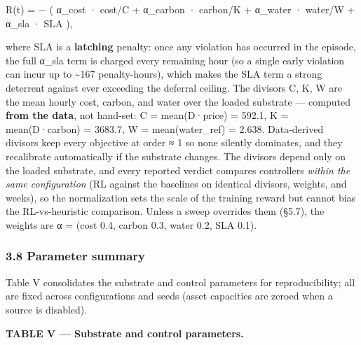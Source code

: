 \documentclass[
  11pt,
]{article}
\newcounter{none} %
\begin{document}
R(t) = − ( α\_cost · cost/C + α\_carbon · carbon/K + α\_water · water/W
+ α\_sla · SLA ),

where SLA is a \textbf{latching} penalty: once any violation has
occurred in the episode, the full α\_sla term is charged every remaining
hour (so a single early violation can incur up to \textasciitilde167
penalty-hours), which makes the SLA term a strong deterrent against ever
exceeding the deferral ceiling. The divisors C, K, W are the mean hourly
cost, carbon, and water over the loaded substrate --- computed
\textbf{from the data}, not hand-set: C = mean(D·price) = 592.1, K =
mean(D·carbon) = 3683.7, W = mean(water\_ref) = 2.638. Data-derived
divisors keep every objective at order ≈ 1 so none silently dominates,
and they recalibrate automatically if the substrate changes. The
divisors depend only on the loaded substrate, and every reported verdict
compares controllers \emph{within the same configuration} (RL against
the baselines on identical divisors, weights, and weeks), so the
normalization sets the scale of the training reward but cannot bias the
RL-vs-heuristic comparison. Unless a sweep overrides them (§5.7), the
weights are α = (cost 0.4, carbon 0.3, water 0.2, SLA 0.1).

\subsubsection{3.8 Parameter summary}\label{parameter-summary}

Table V consolidates the substrate and control parameters for
reproducibility; all are fixed across configurations and seeds (asset
capacities are zeroed when a source is disabled).

\textbf{TABLE V --- Substrate and control parameters.}
\end{document}
